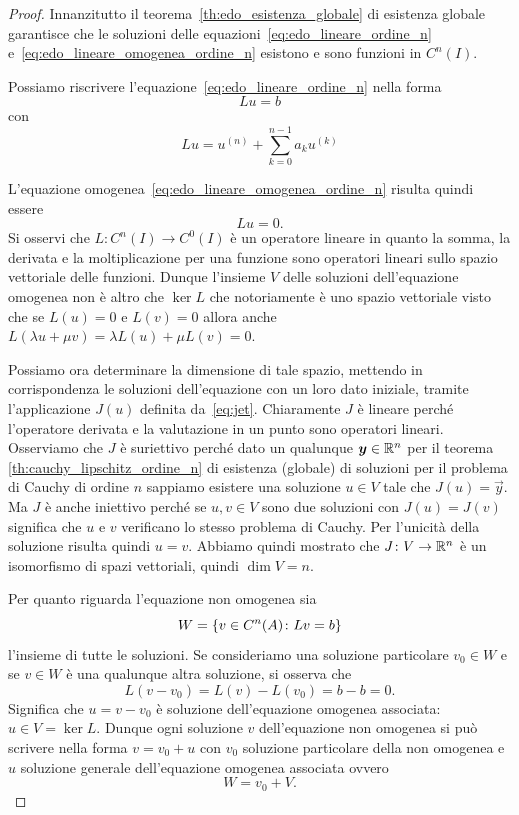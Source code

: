 \begin{proof}
\mymark{***}
Innanzitutto il teorema~\ref{th:edo_esistenza_globale} di esistenza globale garantisce che
le soluzioni delle equazioni~\eqref{eq:edo_lineare_ordine_n}
e~\eqref{eq:edo_lineare_omogenea_ordine_n} esistono e sono funzioni in $C^n(I)$.

Possiamo riscrivere l'equazione~\eqref{eq:edo_lineare_ordine_n} nella forma
\[
  Lu = b
\]
con
\[
  Lu = u^{(n)} + \sum_{k=0}^{n-1} a_k u^{(k)}
\]

L'equazione omogenea~\eqref{eq:edo_lineare_omogenea_ordine_n}
risulta quindi essere
\[
  Lu = 0.
\]
Si osservi che $L\colon C^n(I) \to C^0(I)$ è un operatore lineare in quanto la
somma, la derivata e la moltiplicazione per una funzione sono operatori lineari
sullo spazio vettoriale delle funzioni.
Dunque l'insieme $V$ delle soluzioni dell'equazione omogenea non è altro che
$\ker L$ che notoriamente è uno spazio vettoriale visto che se $L(u)=0$ e $L(v)=0$
allora anche $L(\lambda u + \mu v) = \lambda L(u) + \mu L(v) = 0$.

Possiamo ora determinare la dimensione di tale spazio, mettendo in
corrispondenza le soluzioni dell'equazione con un loro dato iniziale,
tramite l'applicazione $J(u)$ definita da~\eqref{eq:jet}.
Chiaramente $J$ è lineare perché l'operatore derivata e la valutazione in un
punto sono operatori lineari. Osserviamo che $J$ è suriettivo perché dato un
qualunque $\boldsymbol y\in \mathbb R^n$ per il teorema \ref{th:cauchy_lipschitz_ordine_n}
di esistenza (globale) di soluzioni per il problema di Cauchy di ordine $n$
sappiamo esistere una soluzione $u\in V$ tale che $J(u)=\vec y$. Ma $J$ è anche
iniettivo perché se $u,v\in V$ sono due soluzioni con $J(u)=J(v)$ significa
che $u$ e $v$ verificano lo stesso problema di Cauchy.
Per l'unicità della soluzione risulta quindi $u=v$.
Abbiamo quindi mostrato che $J\colon V \to \mathbb R^n$ è un isomorfismo di spazi
 vettoriali, quindi $\dim V=n$.

Per quanto riguarda l'equazione non omogenea
sia
\[
W = {\left\{ v\in C^n(A)\colon L v = b \right\}}
\]
l'insieme di tutte le soluzioni.
Se consideriamo una soluzione particolare $v_0\in W$ e se $v\in W$ è una
qualunque altra soluzione, si osserva che
\[
  L(v-v_0) = L(v) - L(v_0) = b-b = 0.
\]
Significa che $u=v-v_0$ è soluzione dell'equazione omogenea associata:
$u\in V=\ker L$.
Dunque ogni soluzione $v$ dell'equazione non omogenea si può scrivere nella
forma $v = v_0 + u$ con $v_0$ soluzione particolare della non omogenea e
$u$ soluzione generale dell'equazione omogenea associata ovvero
\[
  W = v_0 + V.
\]
\end{proof}


